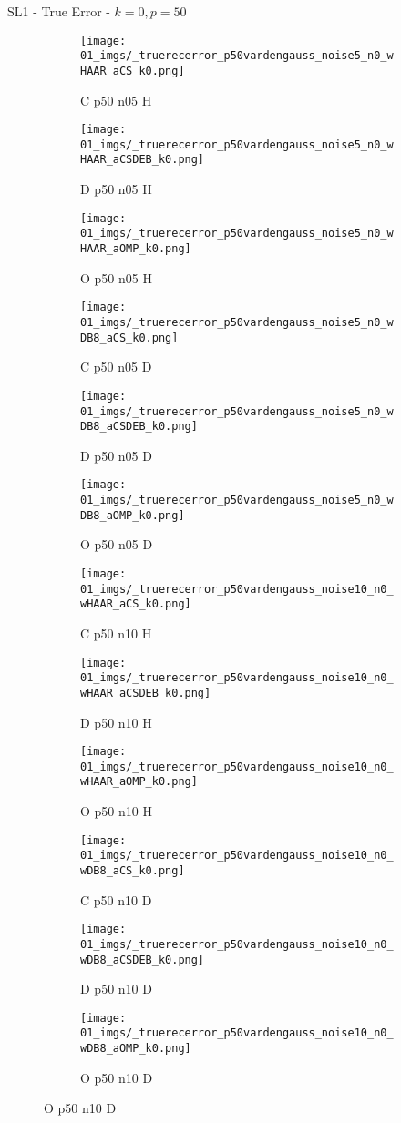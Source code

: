 \begin{frame}{SL1 - True Error - $k=0,p=50$}{}
\begin{figure}
\begin{subfigure}{0.13\textwidth}
\texttt{[image: 01\_imgs/\_truerecerror\_p50vardengauss\_noise5\_n0\_wHAAR\_aCS\_k0.png]}
\caption*{\tiny C p50 n05 H}
\end{subfigure}
\begin{subfigure}{0.13\textwidth}
\texttt{[image: 01\_imgs/\_truerecerror\_p50vardengauss\_noise5\_n0\_wHAAR\_aCSDEB\_k0.png]}
\caption*{\tiny D p50 n05 H}
\end{subfigure}
\begin{subfigure}{0.13\textwidth}
\texttt{[image: 01\_imgs/\_truerecerror\_p50vardengauss\_noise5\_n0\_wHAAR\_aOMP\_k0.png]}
\caption*{\tiny O p50 n05 H}
\end{subfigure}
\begin{subfigure}{0.13\textwidth}
\texttt{[image: 01\_imgs/\_truerecerror\_p50vardengauss\_noise5\_n0\_wDB8\_aCS\_k0.png]}
\caption*{\tiny C p50 n05 D}
\end{subfigure}
\begin{subfigure}{0.13\textwidth}
\texttt{[image: 01\_imgs/\_truerecerror\_p50vardengauss\_noise5\_n0\_wDB8\_aCSDEB\_k0.png]}
\caption*{\tiny D p50 n05 D}
\end{subfigure}
\begin{subfigure}{0.13\textwidth}
\texttt{[image: 01\_imgs/\_truerecerror\_p50vardengauss\_noise5\_n0\_wDB8\_aOMP\_k0.png]}
\caption*{\tiny O p50 n05 D}
\end{subfigure}

\vspace{5pt}

\begin{subfigure}{0.13\textwidth}
\texttt{[image: 01\_imgs/\_truerecerror\_p50vardengauss\_noise10\_n0\_wHAAR\_aCS\_k0.png]}
\caption*{\tiny C p50 n10 H}
\end{subfigure}
\begin{subfigure}{0.13\textwidth}
\texttt{[image: 01\_imgs/\_truerecerror\_p50vardengauss\_noise10\_n0\_wHAAR\_aCSDEB\_k0.png]}
\caption*{\tiny D p50 n10 H}
\end{subfigure}
\begin{subfigure}{0.13\textwidth}
\texttt{[image: 01\_imgs/\_truerecerror\_p50vardengauss\_noise10\_n0\_wHAAR\_aOMP\_k0.png]}
\caption*{\tiny O p50 n10 H}
\end{subfigure}
\begin{subfigure}{0.13\textwidth}
\texttt{[image: 01\_imgs/\_truerecerror\_p50vardengauss\_noise10\_n0\_wDB8\_aCS\_k0.png]}
\caption*{\tiny C p50 n10 D}
\end{subfigure}
\begin{subfigure}{0.13\textwidth}
\texttt{[image: 01\_imgs/\_truerecerror\_p50vardengauss\_noise10\_n0\_wDB8\_aCSDEB\_k0.png]}
\caption*{\tiny D p50 n10 D}
\end{subfigure}
\begin{subfigure}{0.13\textwidth}
\texttt{[image: 01\_imgs/\_truerecerror\_p50vardengauss\_noise10\_n0\_wDB8\_aOMP\_k0.png]}
\caption*{\tiny O p50 n10 D}
\end{subfigure}


\end{figure}
\end{frame}
